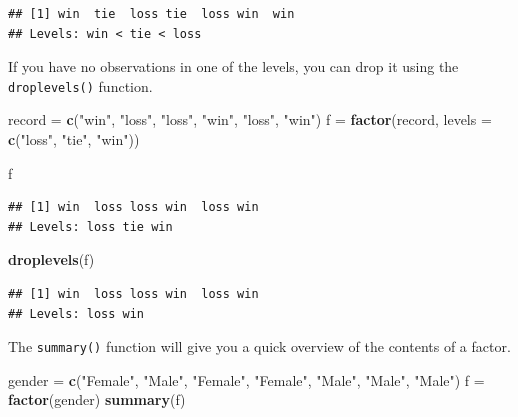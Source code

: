 \documentclass[
]{book}
\newenvironment{Shaded}{\begin{snugshade}}{\end{snugshade}}
\newcommand{\DataTypeTok}[1]{\textcolor[rgb]{0.13,0.29,0.53}{#1}}
\newcommand{\KeywordTok}[1]{\textcolor[rgb]{0.13,0.29,0.53}{\textbf{#1}}}
\newcommand{\NormalTok}[1]{#1}
\newcommand{\StringTok}[1]{\textcolor[rgb]{0.31,0.60,0.02}{#1}}
\begin{document}
\begin{verbatim}
## [1] win  tie  loss tie  loss win  win 
## Levels: win < tie < loss
\end{verbatim}

If you have no observations in one of the levels, you can drop it using the \texttt{droplevels()} function.

\begin{Shaded}
\begin{Highlighting}[]
\NormalTok{record =}\StringTok{ }\KeywordTok{c}\NormalTok{(}\StringTok{"win"}\NormalTok{, }\StringTok{"loss"}\NormalTok{, }\StringTok{"loss"}\NormalTok{, }\StringTok{"win"}\NormalTok{, }\StringTok{"loss"}\NormalTok{, }\StringTok{"win"}\NormalTok{)}
\NormalTok{f =}\StringTok{ }\KeywordTok{factor}\NormalTok{(record,}
            \DataTypeTok{levels =} \KeywordTok{c}\NormalTok{(}\StringTok{"loss"}\NormalTok{, }\StringTok{"tie"}\NormalTok{, }\StringTok{"win"}\NormalTok{))}

\NormalTok{f}
\end{Highlighting}
\end{Shaded}

\begin{verbatim}
## [1] win  loss loss win  loss win 
## Levels: loss tie win
\end{verbatim}

\begin{Shaded}
\begin{Highlighting}[]
\KeywordTok{droplevels}\NormalTok{(f)}
\end{Highlighting}
\end{Shaded}

\begin{verbatim}
## [1] win  loss loss win  loss win 
## Levels: loss win
\end{verbatim}

The \texttt{summary()} function will give you a quick overview of the contents of a factor.

\begin{Shaded}
\begin{Highlighting}[]
\NormalTok{gender =}\StringTok{ }\KeywordTok{c}\NormalTok{(}\StringTok{"Female"}\NormalTok{, }\StringTok{"Male"}\NormalTok{, }\StringTok{"Female"}\NormalTok{, }\StringTok{"Female"}\NormalTok{, }\StringTok{"Male"}\NormalTok{, }\StringTok{"Male"}\NormalTok{, }\StringTok{"Male"}\NormalTok{)}
\NormalTok{f =}\StringTok{ }\KeywordTok{factor}\NormalTok{(gender)}
\KeywordTok{summary}\NormalTok{(f)}
\end{Highlighting}
\end{Shaded}
\end{document}
